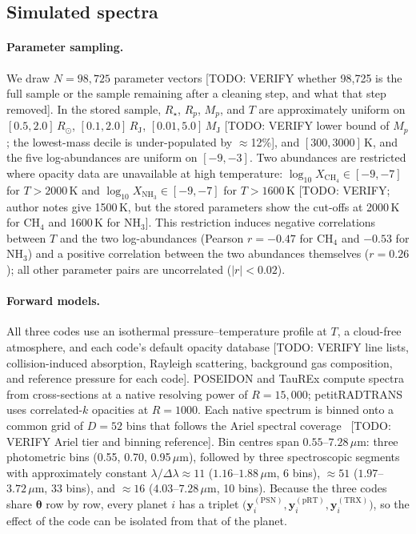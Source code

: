 \subsection{Simulated spectra}
\label{sec:data}

\paragraph{Parameter sampling.}
We draw $N=98{,}725$ parameter vectors [TODO: VERIFY whether 98,725 is the full sample or the sample remaining after a cleaning step, and what that step removed].
In the stored sample, $R_\star$, $R_p$, $M_p$, and $T$ are approximately uniform on $[0.5,2.0]\,R_\odot$, $[0.1,2.0]\,R_\mathrm{J}$, $[0.01,5.0]\,M_\mathrm{J}$ [TODO: VERIFY lower bound of $M_p$; the lowest-mass decile is under-populated by $\approx$12\%], and $[300,3000]\,\mathrm{K}$, and the five log-abundances are uniform on $[-9,-3]$.
Two abundances are restricted where opacity data are unavailable at high temperature: $\log_{10}X_{\mathrm{CH_4}}\in[-9,-7]$ for $T>2000\,\mathrm{K}$ and $\log_{10}X_{\mathrm{NH_3}}\in[-9,-7]$ for $T>1600\,\mathrm{K}$ [TODO: VERIFY; author notes give 1500\,K, but the stored parameters show the cut-offs at 2000\,K for CH$_4$ and 1600\,K for NH$_3$].
This restriction induces negative correlations between $T$ and the two log-abundances (Pearson $r=-0.47$ for CH$_4$ and $-0.53$ for NH$_3$) and a positive correlation between the two abundances themselves ($r=0.26$); all other parameter pairs are uncorrelated ($|r|<0.02$).

\paragraph{Forward models.}
All three codes use an isothermal pressure--temperature profile at $T$, a cloud-free atmosphere, and each code's default opacity database [TODO: VERIFY line lists, collision-induced absorption, Rayleigh scattering, background gas composition, and reference pressure for each code].
POSEIDON and TauREx compute spectra from cross-sections at a native resolving power of $R=15{,}000$; petitRADTRANS uses correlated-$k$ opacities at $R=1000$.
Each native spectrum is binned onto a common grid of $D=52$ bins that follows the Ariel spectral coverage~\cite{TODO_tinetti_ariel_mission} [TODO: VERIFY Ariel tier and binning reference].
Bin centres span $0.55$--$7.28\,\mu\mathrm{m}$: three photometric bins (0.55, 0.70, 0.95\,$\mu$m), followed by three spectroscopic segments with approximately constant $\lambda/\Delta\lambda\approx 11$ ($1.16$--$1.88\,\mu$m, 6 bins), $\approx 51$ ($1.97$--$3.72\,\mu$m, 33 bins), and $\approx 16$ ($4.03$--$7.28\,\mu$m, 10 bins).
Because the three codes share $\bm{\theta}$ row by row, every planet $i$ has a triplet $\bigl(\mathbf{y}_i^{(\mathrm{PSN})},\mathbf{y}_i^{(\mathrm{pRT})},\mathbf{y}_i^{(\mathrm{TRX})}\bigr)$, so the effect of the code can be isolated from that of the planet.

